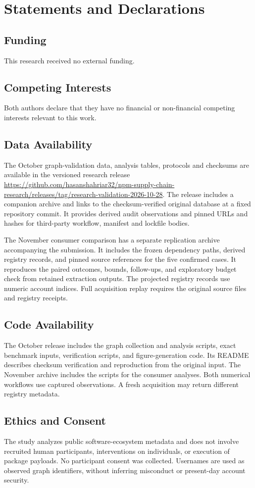 \section*{Statements and Declarations}

\subsection*{Funding}
This research received no external funding.

\subsection*{Competing Interests}
Both authors declare that they have no financial or non-financial competing interests relevant to this work.

\subsection*{Data Availability}
\providecommand{\ArtifactAccessStatement}{The October graph-validation data, analysis tables, protocols and checksums are available in the versioned research release \url{https://github.com/hasanshahriar32/npm-supply-chain-research/releases/tag/research-validation-2026-10-28}. The release includes a companion archive and links to the checksum-verified original database at a fixed repository commit. It provides derived audit observations and pinned URLs and hashes for third-party workflow, manifest and lockfile bodies.}
\ArtifactAccessStatement

The November consumer comparison has a separate replication archive
accompanying the submission. It includes the frozen dependency paths,
derived registry records, and pinned source references for the five
confirmed cases. It reproduces the paired outcomes, bounds, follow-ups,
and exploratory budget check from retained extraction outputs. The
projected registry records use numeric account indices. Full acquisition
replay requires the original source files and registry receipts.

\subsection*{Code Availability}
The October release includes the graph collection and analysis scripts, exact benchmark inputs, verification scripts, and figure-generation code. Its README describes checksum verification and reproduction from the original input. The November archive includes the scripts for the consumer analyses. Both numerical workflows use captured observations. A fresh acquisition may return different registry metadata.

\subsection*{Ethics and Consent}
The study analyzes public software-ecosystem metadata and does not involve recruited human participants, interventions on individuals, or execution of package payloads. No participant consent was collected. Usernames are used as observed graph identifiers, without inferring misconduct or present-day account security.

